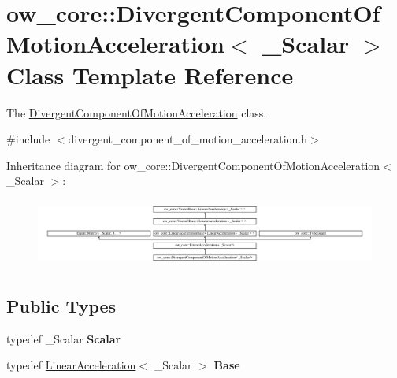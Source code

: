 \hypertarget{classow__core_1_1DivergentComponentOfMotionAcceleration}{}\section{ow\+\_\+core\+:\+:Divergent\+Component\+Of\+Motion\+Acceleration$<$ \+\_\+\+Scalar $>$ Class Template Reference}
\label{classow__core_1_1DivergentComponentOfMotionAcceleration}


The \hyperlink{classow__core_1_1DivergentComponentOfMotionAcceleration}{Divergent\+Component\+Of\+Motion\+Acceleration} class.  




{\ttfamily \#include $<$divergent\+\_\+component\+\_\+of\+\_\+motion\+\_\+acceleration.\+h$>$}

Inheritance diagram for ow\+\_\+core\+:\+:Divergent\+Component\+Of\+Motion\+Acceleration$<$ \+\_\+\+Scalar $>$\+:\begin{figure}[H]
\begin{center}
\leavevmode
\includegraphics[height=2.270884cm]{d6/d1b/classow__core_1_1DivergentComponentOfMotionAcceleration}
\end{center}
\end{figure}
\subsection*{Public Types}
\begin{DoxyCompactItemize}
\item 
typedef \+\_\+\+Scalar {\bfseries Scalar}\hypertarget{classow__core_1_1DivergentComponentOfMotionAcceleration_ab593d692a9c37a4a31447b701c9b8ad4}{}\label{classow__core_1_1DivergentComponentOfMotionAcceleration_ab593d692a9c37a4a31447b701c9b8ad4}

\item 
typedef \hyperlink{classow__core_1_1LinearAcceleration}{Linear\+Acceleration}$<$ \+\_\+\+Scalar $>$ {\bfseries Base}\hypertarget{classow__core_1_1DivergentComponentOfMotionAcceleration_af69032ca53314a62129c47dc042732f0}{}\label{classow__core_1_1DivergentComponentOfMotionAcceleration_af69032ca53314a62129c47dc042732f0}

\end{DoxyCompactItemize}
